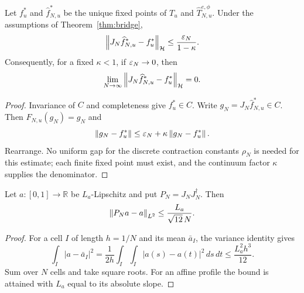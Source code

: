 \begin{corollary}\label{cor:bridge-fixed-points}
Let $f_u^\ast$ and $\widehat f_{N,u}^\ast$ be the unique fixed points of $T_u$ and $\widehat T_{N,u}^{e,\phi}$. Under the assumptions of Theorem~\ref{thm:bridge},
\[
\left\lVert J_N\widehat f_{N,u}^\ast-f_u^\ast \right\rVert_{\mathcal{H}}
\le
\frac{\varepsilon_N}{1-\kappa}.
\]
Consequently, for a fixed $\kappa<1$, if $\varepsilon_N\to0$, then
\[
\lim_{N\to\infty}\left\lVert J_N\widehat f_{N,u}^\ast-f_u^\ast \right\rVert_{\mathcal{H}}=0.
\]
\end{corollary}

\begin{proof}
Invariance of $C$ and completeness give $f_u^\ast\in C$. Write $g_N=J_N\widehat f_{N,u}^\ast\in C$. Then $F_{N,u}(g_N)=g_N$ and
\[
\left\lVert g_N-f_u^\ast \right\rVert\leq\varepsilon_N+\kappa\left\lVert g_N-f_u^\ast \right\rVert.
\]
Rearrange. No uniform gap for the discrete contraction constants $\rho_N$ is needed for this estimate; each finite fixed point must exist, and the continuum factor $\kappa$ supplies the denominator.
\end{proof}

\begin{lemma}\label{lem:cell-average-error}
Let $a:[0,1]\to\mathbb{R}$ be $L_a$-Lipschitz and put $P_N=J_NJ_N^\dagger$. Then
\[
\left\lVert P_Na-a \right\rVert_{L^2}\leq\frac{L_a}{\sqrt{12}\,N}.
\]
\end{lemma}

\begin{proof}
For a cell $I$ of length $h=1/N$ and its mean $\bar a_I$, the variance identity gives
\[
\int_I|a-\bar a_I|^2
=\frac{1}{2h}\int_I\int_I|a(s)-a(t)|^2\,ds\,dt
\leq\frac{L_a^2h^3}{12}.
\]
Sum over $N$ cells and take square roots. For an affine profile the bound is attained with $L_a$ equal to its absolute slope.
\end{proof}

